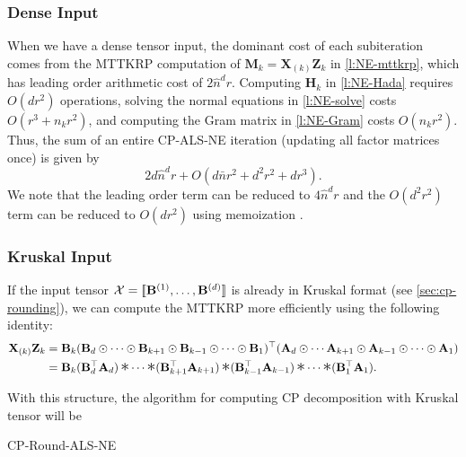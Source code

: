 \documentclass{article}
\newcommand{\mat}[1]{\mathbf{#1}}
\newcommand{\T}[2][]{#1{\mathbf{\cal{#2}}}} 						%
\DeclareMathOperator*{\hada}{\scalebox{1.5}{$\ast$}}
\begin{document}
\subsubsection{Dense Input}

When we have a dense tensor input, the dominant cost of each subiteration comes from the MTTKRP computation of $\mat{M}_k = \mat{X}_{(k)}\mat{Z}_k$ in \cref{l:NE-mttkrp}, which has leading order arithmetic cost of $2\hat n^dr$.
Computing $\mat{H}_k$ in \cref{l:NE-Hada} requires $O(dr^2)$ operations, solving the normal equations in \cref{l:NE-solve} costs $O(r^3+n_kr^2)$, and computing the Gram matrix in \cref{l:NE-Gram} costs $O(n_kr^2)$.
Thus, the sum of an entire CP-ALS-NE iteration (updating all factor matrices once) is given by
\begin{equation*}
2d\hat n^dr + O(d\bar n r^2 + d^2r^2 + dr^3).
\end{equation*}
We note that the leading order term can be reduced to $4\hat n^d r$ and the $O(d^2r^2)$ term can be reduced to $O(dr^2)$ using memoization \cite{phan2013fast}. 
\subsubsection{Kruskal Input}
If the input tensor $\T{X}=[\![\mat{B}^{(1)}, \dots ,\mat{B}^{(d)}]\!]$ is already in Kruskal format (see \cref{sec:cp-rounding}), we can compute the MTTKRP more efficiently using the following identity:
\begin{align*}
  \mat{X}_{(k)}\mat{Z}_k &= \mat{B}_k(\mat{B}_d \odot \dots \odot \mat{B}_{k+1} \odot \mat{B}_{k-1} \odot \dots \odot \mat{B}_1)^\top(\mat{A}_d \odot \cdots \mat{A}_{k+1} \odot \mat{A}_{k-1} \odot \cdots \odot \mat{A}_1) \\
 &= \mat{B}_k(\mat{B}_d^\top\mat{A}_d) \hada \cdots \hada (\mat{B}_{k+1}^\top\mat{A}_{k+1}) \hada (\mat{B}_{k-1}^\top\mat{A}_{k-1}) \hada \cdots \hada (\mat{B}_1^\top\mat{A}_1).  
\end{align*}

With this structure, the algorithm for computing CP decomposition with Kruskal tensor will be  
\begin{algorithm}[!ht]
  \caption{CP-Round-ALS-NE}
  \label{alg:cp-als-ne-k}
  
  
\end{algorithm}

\end{document}
